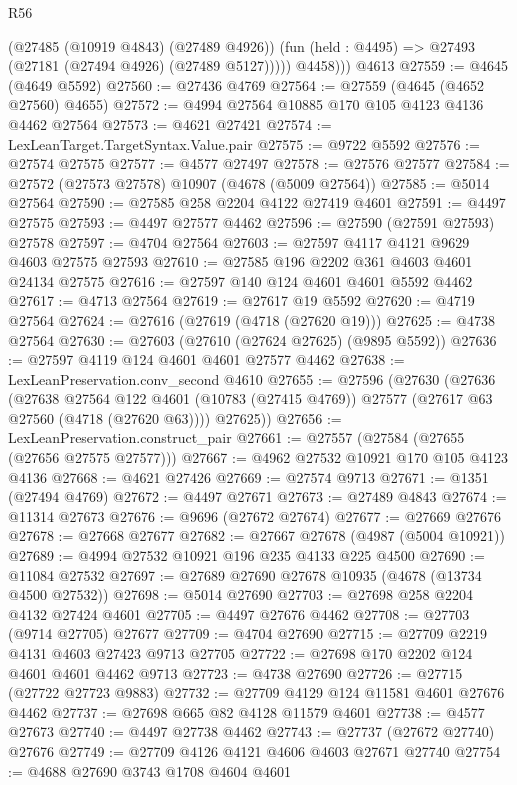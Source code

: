 \begin{lexlean}{R56}
\begin{coremodule}
            (@27485 (@10919 @4843) (@27489 @4926))
            (fun (held : @4495) => @27493 (@27181 (@27494 @4926) (@27489 @5127)))))
          @4458)))
    @4613
@27559 := @4645 (@4649 @5592)
@27560 := @27436 @4769
@27564 := @27559 (@4645 (@4652 @27560) @4655)
@27572 := @4994 @27564 @10885 @170 @105 @4123 @4136 @4462 @27564
@27573 := @4621 @27421
@27574 := LexLeanTarget.TargetSyntax.Value.pair
@27575 := @9722 @5592
@27576 := @27574 @27575
@27577 := @4577 @27497
@27578 := @27576 @27577
@27584 := @27572 (@27573 @27578) @10907 (@4678 (@5009 @27564))
@27585 := @5014 @27564
@27590 := @27585 @258 @2204 @4122 @27419 @4601
@27591 := @4497 @27575
@27593 := @4497 @27577 @4462
@27596 := @27590 (@27591 @27593) @27578
@27597 := @4704 @27564
@27603 := @27597 @4117 @4121 @9629 @4603 @27575 @27593
@27610 := @27585 @196 @2202 @361 @4603 @4601 @24134 @27575
@27616 := @27597 @140 @124 @4601 @4601 @5592 @4462
@27617 := @4713 @27564
@27619 := @27617 @19 @5592
@27620 := @4719 @27564
@27624 := @27616 (@27619 (@4718 (@27620 @19)))
@27625 := @4738 @27564
@27630 := @27603 (@27610 (@27624 @27625) (@9895 @5592))
@27636 := @27597 @4119 @124 @4601 @4601 @27577 @4462
@27638 := LexLeanPreservation.conv_second @4610
@27655 := @27596
    (@27630
      (@27636
        (@27638
          @27564
          @122
          @4601
          (@10783 (@27415 @4769))
          @27577
          (@27617 @63 @27560 (@4718 (@27620 @63))))
        @27625))
@27656 := LexLeanPreservation.construct_pair
@27661 := @27557 (@27584 (@27655 (@27656 @27575 @27577)))
@27667 := @4962 @27532 @10921 @170 @105 @4123 @4136
@27668 := @4621 @27426
@27669 := @27574 @9713
@27671 := @1351 (@27494 @4769)
@27672 := @4497 @27671
@27673 := @27489 @4843
@27674 := @11314 @27673
@27676 := @9696 (@27672 @27674)
@27677 := @27669 @27676
@27678 := @27668 @27677
@27682 := @27667 @27678 (@4987 (@5004 @10921))
@27689 := @4994 @27532 @10921 @196 @235 @4133 @225 @4500
@27690 := @11084 @27532
@27697 := @27689 @27690 @27678 @10935 (@4678 (@13734 @4500 @27532))
@27698 := @5014 @27690
@27703 := @27698 @258 @2204 @4132 @27424 @4601
@27705 := @4497 @27676 @4462
@27708 := @27703 (@9714 @27705) @27677
@27709 := @4704 @27690
@27715 := @27709 @2219 @4131 @4603 @27423 @9713 @27705
@27722 := @27698 @170 @2202 @124 @4601 @4601 @4462 @9713
@27723 := @4738 @27690
@27726 := @27715 (@27722 @27723 @9883)
@27732 := @27709 @4129 @124 @11581 @4601 @27676 @4462
@27737 := @27698 @665 @82 @4128 @11579 @4601
@27738 := @4577 @27673
@27740 := @4497 @27738 @4462
@27743 := @27737 (@27672 @27740) @27676
@27749 := @27709 @4126 @4121 @4606 @4603 @27671 @27740
@27754 := @4688 @27690 @3743 @1708 @4604 @4601

\end{coremodule}
\end{lexlean}
